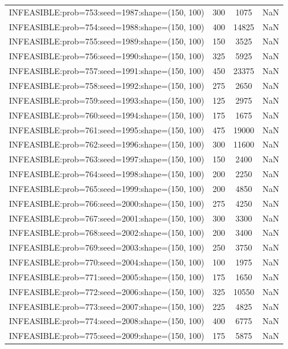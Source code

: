 \begin{longtable}{lccc}
INFEASIBLE:prob=753:seed=1987:shape=(150, 100) &      300 &  1075 &    NaN \\
INFEASIBLE:prob=754:seed=1988:shape=(150, 100) &      400 & 14825 &    NaN \\
INFEASIBLE:prob=755:seed=1989:shape=(150, 100) &      150 &  3525 &    NaN \\
INFEASIBLE:prob=756:seed=1990:shape=(150, 100) &      325 &  5925 &    NaN \\
INFEASIBLE:prob=757:seed=1991:shape=(150, 100) &      450 & 23375 &    NaN \\
INFEASIBLE:prob=758:seed=1992:shape=(150, 100) &      275 &  2650 &    NaN \\
INFEASIBLE:prob=759:seed=1993:shape=(150, 100) &      125 &  2975 &    NaN \\
INFEASIBLE:prob=760:seed=1994:shape=(150, 100) &      175 &  1675 &    NaN \\
INFEASIBLE:prob=761:seed=1995:shape=(150, 100) &      475 & 19000 &    NaN \\
INFEASIBLE:prob=762:seed=1996:shape=(150, 100) &      300 & 11600 &    NaN \\
INFEASIBLE:prob=763:seed=1997:shape=(150, 100) &      150 &  2400 &    NaN \\
INFEASIBLE:prob=764:seed=1998:shape=(150, 100) &      200 &  2250 &    NaN \\
INFEASIBLE:prob=765:seed=1999:shape=(150, 100) &      200 &  4850 &    NaN \\
INFEASIBLE:prob=766:seed=2000:shape=(150, 100) &      275 &  4250 &    NaN \\
INFEASIBLE:prob=767:seed=2001:shape=(150, 100) &      300 &  3300 &    NaN \\
INFEASIBLE:prob=768:seed=2002:shape=(150, 100) &      200 &  3400 &    NaN \\
INFEASIBLE:prob=769:seed=2003:shape=(150, 100) &      250 &  3750 &    NaN \\
INFEASIBLE:prob=770:seed=2004:shape=(150, 100) &      100 &  1975 &    NaN \\
INFEASIBLE:prob=771:seed=2005:shape=(150, 100) &      175 &  1650 &    NaN \\
INFEASIBLE:prob=772:seed=2006:shape=(150, 100) &      325 & 10550 &    NaN \\
INFEASIBLE:prob=773:seed=2007:shape=(150, 100) &      225 &  4825 &    NaN \\
INFEASIBLE:prob=774:seed=2008:shape=(150, 100) &      400 &  6775 &    NaN \\
INFEASIBLE:prob=775:seed=2009:shape=(150, 100) &      175 &  5875 &    NaN \\

\end{longtable}
